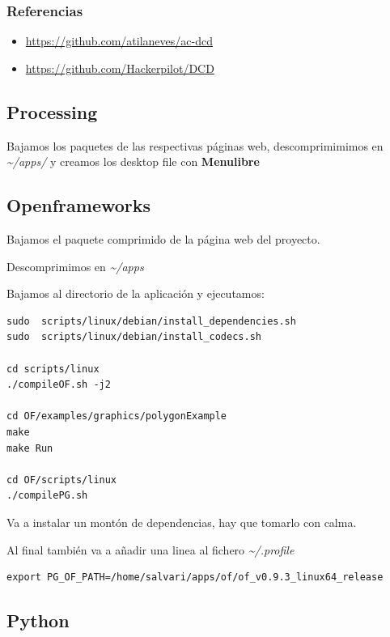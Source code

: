 \documentclass[12pt,spanish,]{scrartcl}
\providecommand{\tightlist}{%
  \setlength{\itemsep}{0pt}\setlength{\parskip}{0pt}}
\begin{document}
\subsubsection{Referencias}\label{referencias}

\begin{itemize}
\tightlist
\item
  \url{https://github.com/atilaneves/ac-dcd}
\item
  \url{https://github.com/Hackerpilot/DCD}
\end{itemize}

\subsection{Processing}\label{processing}

Bajamos los paquetes de las respectivas páginas web, descomprimimimos en
\emph{\textasciitilde{}/apps/} y creamos los desktop file con
\textbf{Menulibre}

\subsection{Openframeworks}\label{openframeworks}

Bajamos el paquete comprimido de la página web del proyecto.

Descomprimimos en \emph{\textasciitilde{}/apps}

Bajamos al directorio de la aplicación y ejecutamos:

\begin{verbatim}
sudo  scripts/linux/debian/install_dependencies.sh
sudo  scripts/linux/debian/install_codecs.sh

cd scripts/linux
./compileOF.sh -j2

cd OF/examples/graphics/polygonExample
make
make Run

cd OF/scripts/linux
./compilePG.sh
\end{verbatim}

Va a instalar un montón de dependencias, hay que tomarlo con calma.

Al final también va a añadir una linea al fichero
\emph{\textasciitilde{}/.profile}

\begin{verbatim}
export PG_OF_PATH=/home/salvari/apps/of/of_v0.9.3_linux64_release
\end{verbatim}

\subsection{Python}\label{python}
\end{document}
